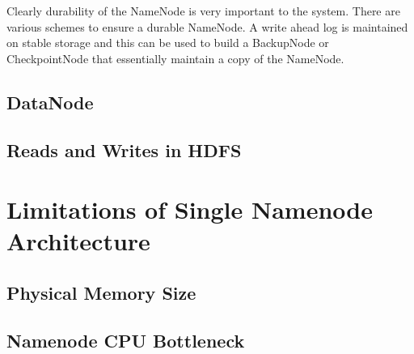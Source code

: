 \documentclass[11pt, a4paper]{article}
\begin{document}
\begin{multicols*}{2}
Clearly durability of the NameNode is very important to the system. There are various schemes to ensure a durable NameNode. A write ahead log is maintained on stable storage and this can be used to build a BackupNode or CheckpointNode that essentially maintain a copy of the NameNode. 


\subsection{DataNode}




\subsection{Reads and Writes in HDFS}


\section{Limitations of Single Namenode Architecture}

\subsection{Physical Memory Size}




\subsection{Namenode CPU Bottleneck}


\end{multicols*}
\end{document}

